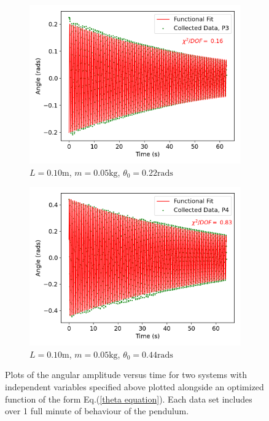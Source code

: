 \begin{figure}[H]
\centering
\begin{subfigure}[t]{0.5\textwidth}
  \centering
  \includegraphics[width=1\textwidth]{Plots/P3.png}
  \caption{\small{$L = 0.10\text{m}$, $m = 0.05\text{kg}$, $\theta_0 = 0.22\text{rads}$}}
  \label{P3}
\end{subfigure}%
\begin{subfigure}[t]{.5\textwidth}
  \centering
  \includegraphics[width=\textwidth]{Plots/P4.png}
  \caption{\small{$L = 0.10\text{m}$, $m = 0.05\text{kg}$, $\theta_0 = 0.44\text{rads}$}}
  \label{P4}
\end{subfigure}
\caption{\small{Plots of the angular amplitude versus time for two systems with independent variables specified above plotted alongside an optimized function of the form Eq.(\ref{theta equation}). Each data set includes over 1 full minute of behaviour of the pendulum.}}
\end{figure}


